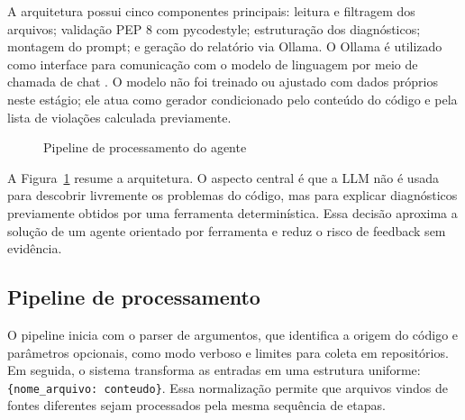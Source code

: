 \documentclass[12pt]{article}
\begin{document}
A arquitetura possui cinco componentes principais: leitura e filtragem dos
arquivos; validação PEP 8 com pycodestyle; estruturação dos diagnósticos;
montagem do prompt; e geração do relatório via Ollama. O Ollama
é utilizado como interface para comunicação com o modelo de linguagem por meio
de chamada de chat \cite{ollama2026docs}. O modelo não foi treinado ou ajustado
com dados próprios neste estágio; ele atua como gerador condicionado pelo
conteúdo do código e pela lista de violações calculada previamente.

\begin{figure}[ht]
\centering
{}
\caption{Pipeline de processamento do agente}
\label{fig:pipeline}
\end{figure}

A Figura~\ref{fig:pipeline} resume a arquitetura. O aspecto central é que a LLM
não é usada para descobrir livremente os problemas do código, mas para explicar
diagnósticos previamente obtidos por uma ferramenta determinística. Essa decisão
aproxima a solução de um agente orientado por ferramenta e reduz o risco de
feedback sem evidência.

\subsection{Pipeline de processamento}

O pipeline inicia com o parser de argumentos, que identifica a origem do código
e parâmetros opcionais, como modo verboso e limites para coleta em repositórios.
Em seguida, o sistema transforma as entradas em uma estrutura uniforme:
\texttt{\{nome\_arquivo: conteudo\}}. Essa normalização permite que arquivos
vindos de fontes diferentes sejam processados pela mesma sequência de etapas.
\end{document}
